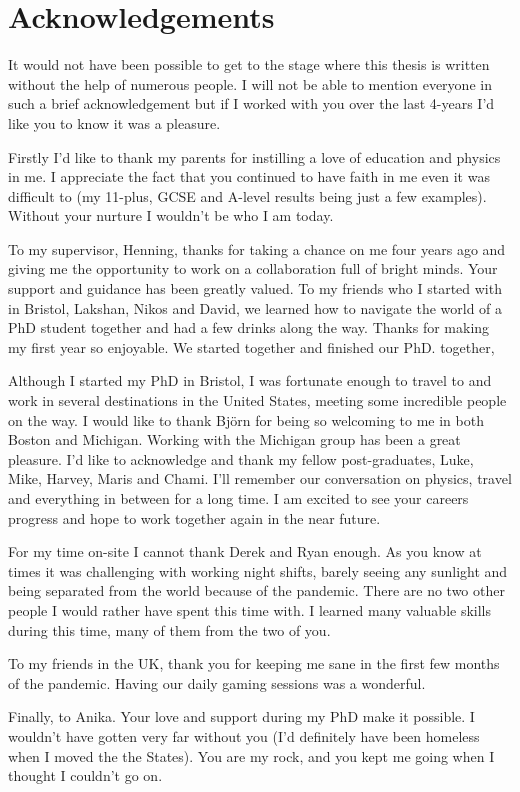 %
%

\chapter*{Acknowledgements}
\begin{SingleSpace}
\par
It would not have been possible to get to the stage where this thesis is written without the help of numerous people.
I will not be able to mention everyone in such a brief acknowledgement but if I worked with you over the last 4-years I'd like you to know it was a pleasure.
\par
Firstly I'd like to thank my parents for instilling a love of education and physics in me. I appreciate the fact that you continued to have faith in me even it was difficult to (my 11-plus, GCSE and A-level results being just a few examples).
Without your nurture I wouldn't be who I am today.
\par
To my supervisor, Henning, thanks for taking a chance on me four years ago and giving me the opportunity to work on a collaboration full of bright minds. 
Your support and guidance has been greatly valued.
To my friends who I started with in Bristol, Lakshan, Nikos and David, we learned how to navigate the world of a PhD student together and had a few drinks along the way. 
Thanks for making my first year so enjoyable.
We started together and finished our PhD. together,
\par
Although I started my PhD in Bristol, I was fortunate enough to travel  to and work in several destinations in the United States, meeting some incredible people on the way. I would like to thank Bj\"{o}rn for being so welcoming to me in both Boston and Michigan.
Working with the Michigan group has been a great pleasure. I'd like to acknowledge and thank my fellow post-graduates, Luke, Mike, Harvey, Maris and Chami. I'll remember our conversation on physics, travel and everything in between for a long time. I am excited to see your careers progress and hope to work together again in the near future.
\par
For my time on-site I cannot thank Derek and Ryan enough. As you know at times it was challenging with working night shifts, barely seeing any sunlight and being separated from the world because of the pandemic. There are no two other people I would rather have spent this time with. I learned many valuable skills during this time, many of them from the two of you. 
\par
To my friends in the UK, thank you for keeping me sane in the first few months of the pandemic.
Having our daily gaming sessions was a wonderful.
\par
Finally, to Anika.
Your love and support during my PhD make it possible.
I wouldn't have gotten very far without you (I'd definitely have been homeless when I moved the the States).
You are my rock, and you kept me going when I thought I couldn't go on.
\end{SingleSpace}
\clearpage